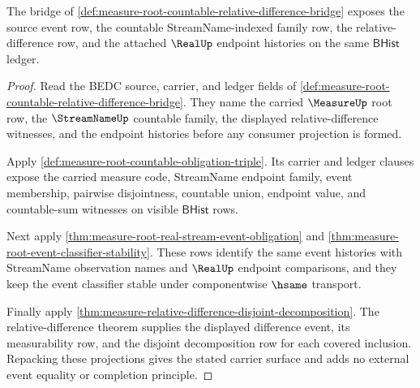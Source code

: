 \begin{theorem}
\label{thm:measure-root-countable-relative-difference-carrier}
The bridge of
\autoref{def:measure-root-countable-relative-difference-bridge} exposes the
source event row, the countable StreamName-indexed family row, the
relative-difference row, and the attached $\RealUp$ endpoint histories on the
same $\mathsf{BHist}$ ledger.
\end{theorem}
\begin{proof}
Read the BEDC source, carrier, and ledger fields of
\autoref{def:measure-root-countable-relative-difference-bridge}. They name
the carried $\MeasureUp$ root row, the $\StreamNameUp$ countable family, the
displayed relative-difference witnesses, and the endpoint histories before
any consumer projection is formed.

Apply \autoref{def:measure-root-countable-obligation-triple}. Its carrier and
ledger clauses expose the carried measure code, StreamName endpoint family,
event membership, pairwise disjointness, countable union, endpoint value, and
countable-sum witnesses on visible $\mathsf{BHist}$ rows.

Next apply \autoref{thm:measure-root-real-stream-event-obligation} and
\autoref{thm:measure-root-event-classifier-stability}. These rows identify
the same event histories with StreamName observation names and $\RealUp$
endpoint comparisons, and they keep the event classifier stable under
componentwise $\hsame$ transport.

Finally apply
\autoref{thm:measure-relative-difference-disjoint-decomposition}. The
relative-difference theorem supplies the displayed difference event, its
measurability row, and the disjoint decomposition row for each covered
inclusion. Repacking these projections gives the stated carrier surface and
adds no external event equality or completion principle.
\end{proof}

